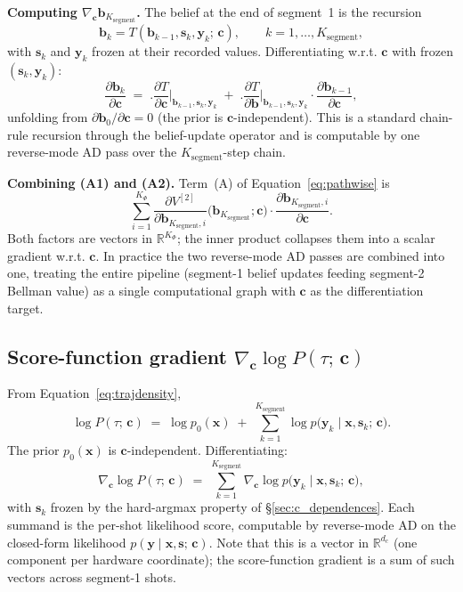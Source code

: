 \documentclass[11pt,a4paper]{article}
\newcommand{\bc}{\bm{c}}
\newcommand{\bx}{\bm{x}}
\newcommand{\by}{\bm{y}}
\newcommand{\bs}{\bm{s}}
\newcommand{\bb}{\bm{b}}
\newcommand{\R}{\mathbb{R}}
\begin{document}
\textbf{Computing $\nabla_{\bc} \bb_{K_\mathrm{segment}}$.}  The belief at the end of segment~1
is the recursion
\[
\bb_k = T(\bb_{k-1}, \bs_k, \by_k;\, \bc), \qquad k = 1, \ldots, K_\mathrm{segment},
\]
with $\bs_k$ and $\by_k$ frozen at their recorded values.  Differentiating w.r.t. $\bc$
with frozen $(\bs_k, \by_k)$:
\begin{equation}
\frac{\partial \bb_k}{\partial \bc}
\;=\;
\biggl.\frac{\partial T}{\partial \bc}\biggr|_{\bb_{k-1}, \bs_k, \by_k}
\;+\;
\biggl.\frac{\partial T}{\partial \bb}\biggr|_{\bb_{k-1}, \bs_k, \by_k}
\cdot
\frac{\partial \bb_{k-1}}{\partial \bc},
\label{eq:belief_chain}
\end{equation}
unfolding from $\partial \bb_0 / \partial \bc = 0$ (the prior is $\bc$-independent).
This is a standard chain-rule recursion through the belief-update operator and is
computable by one reverse-mode AD pass over the $K_\mathrm{segment}$-step chain.

\textbf{Combining (A1) and (A2).}  Term~(A) of Equation~\eqref{eq:pathwise} is
\[
\sum_{i=1}^{K_\Phi} \frac{\partial V^{[2]}}{\partial \bb_{K_\mathrm{segment}, i}}\bigl(\bb_{K_\mathrm{segment}}; \bc\bigr) \cdot \frac{\partial \bb_{K_\mathrm{segment}, i}}{\partial \bc}.
\]
Both factors are vectors in $\R^{K_\Phi}$; the inner product collapses them into a scalar
gradient w.r.t. $\bc$.  In practice the two reverse-mode AD passes are combined into one,
treating the entire pipeline (segment-1 belief updates feeding segment-2 Bellman value) as a
single computational graph with $\bc$ as the differentiation target.

\subsection{Score-function gradient \texorpdfstring{$\nabla_{\bc} \log P(\tau;\, \bc)$}{nabla\_c log P}}
\label{sec:score_function}

From Equation~\eqref{eq:trajdensity},
\[
\log P(\tau;\, \bc)
\;=\;
\log p_0(\bx)
\;+\;
\sum_{k=1}^{K_\mathrm{segment}} \log p\bigl(\by_k \mid \bx, \bs_k;\, \bc\bigr).
\]
The prior $p_0(\bx)$ is $\bc$-independent.  Differentiating:
\begin{equation}
\nabla_{\bc} \log P(\tau;\, \bc)
\;=\;
\sum_{k=1}^{K_\mathrm{segment}} \nabla_{\bc} \log p\bigl(\by_k \mid \bx, \bs_k;\, \bc\bigr),
\label{eq:scorefn}
\end{equation}
with $\bs_k$ frozen by the hard-argmax property of \S\ref{sec:c_dependences}.  Each summand
is the per-shot likelihood score, computable by reverse-mode AD on the closed-form
likelihood $p(\by \mid \bx, \bs;\, \bc)$.  Note that this is a vector in $\R^{d_c}$ (one
component per hardware coordinate); the score-function gradient is a sum of such vectors
across segment-1 shots.
\end{document}
